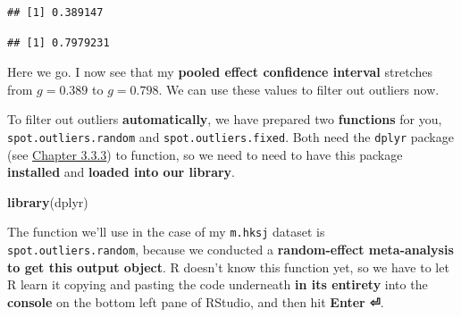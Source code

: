 \documentclass[]{book}
\newenvironment{Shaded}{\begin{snugshade}}{\end{snugshade}}
\newcommand{\KeywordTok}[1]{\textcolor[rgb]{0.13,0.29,0.53}{\textbf{#1}}}
\newcommand{\NormalTok}[1]{#1}
\newcommand{\OperatorTok}[1]{\textcolor[rgb]{0.81,0.36,0.00}{\textbf{#1}}}
\begin{document}
\begin{Shaded}
\end{Shaded}

\begin{verbatim}
## [1] 0.389147
\end{verbatim}

\begin{Shaded}
\end{Shaded}

\begin{verbatim}
## [1] 0.7979231
\end{verbatim}

Here we go. I now see that my \textbf{pooled effect confidence interval} stretches from \(g = 0.389\) to \(g = 0.798\). We can use these values to filter out outliers now.

To filter out outliers \textbf{automatically}, we have prepared two \textbf{functions} for you, \texttt{spot.outliers.random} and \texttt{spot.outliers.fixed}. Both need the \texttt{dplyr} package (see \protect\hyperlink{select}{Chapter 3.3.3}) to function, so we need to need to have this package \textbf{installed} and \textbf{loaded into our library}.

\begin{Shaded}
\begin{Highlighting}[]
\KeywordTok{library}\NormalTok{(dplyr)}
\end{Highlighting}
\end{Shaded}

The function we'll use in the case of my \texttt{m.hksj} dataset is \texttt{spot.outliers.random}, because we conducted a \textbf{random-effect meta-analysis to get this output object}. R doesn't know this function yet, so we have to let R learn it copying and pasting the code underneath \textbf{in its entirety} into the \textbf{console} on the bottom left pane of RStudio, and then hit \textbf{Enter ⏎}.
\end{document}
